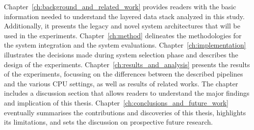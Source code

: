 Chapter~\ref{ch:background_and_related_work} provides readers with the basic information needed to understand the layered data stack analyzed in this study. Additionally, it presents the legacy and novel system architectures that will be used in the experiments. Chapter~\ref{ch:method} delineates the methodologies for the system integration and the system evaluations. Chapter~\ref{ch:implementation} illustrates the decisions made during system selection phase and describes the design of the experiments. Chapter~\ref{ch:results_and_analysis} presents the results of the experiments, focussing on the differences between the described pipelines and the various \gls{CPU} settings, as well as results of related works. The chapter includes a discussion section that allows readers to understand the major findings and implication of this thesis. Chapter~\ref{ch:conclusions_and_future_work} eventually summarises the contributions and discoveries of this thesis, highlights its limitations, and sets the discussion on prospective future research.